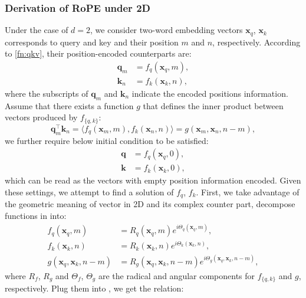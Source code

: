 \documentclass{article}
\def\q{{\boldsymbol q}}
\def\k{{\boldsymbol k}}
\def\x{{\boldsymbol x}}
\begin{document}
\subsubsection{Derivation of RoPE under 2D}\label{appendix:rope-deriv}
Under the case of $d=2$, we consider two-word embedding vectors $\x_q$, $\x_k$ corresponds to query and key and their position $m$ and $n$, respectively. According to \cref{fn:qkv}, their position-encoded counterparts are: 
\begin{equation}
	\begin{aligned}
		\q_m &= f_q(\x_q, m),  \\
		\k_n &= f_k(\x_k, n),
	\end{aligned}
	\label{fn:deri-qk}
\end{equation}
where the subscripts of $\q_m$ and $\k_n$ indicate the encoded positions information. Assume that there exists a function $g$ that defines the inner product between vectors produced by $f_{\{q, k\}}$: 
\begin{equation}
	\q^\intercal_m\k_n = \langle f_q(\x_m, m),f_k(\x_n, n)\rangle= g(\x_m, \x_n, n - m),
	\label{fn:deri-g}
\end{equation}
we further require below initial condition to be satisfied:
\begin{equation}
	\begin{aligned}
		\q &= f_q(\x_q, 0), \\
		\k &= f_k(\x_k, 0), 
	\end{aligned}
	\label{fn:deri-initCond1}
\end{equation}
which can be read as the vectors with empty position information encoded. Given these settings, we attempt to find a solution of $f_q$, $f_k$.  First, we take advantage of the geometric meaning of vector in 2D and its complex counter part, decompose functions in  into:
\begin{equation}
	\begin{aligned}
		f_q(\x_q, m) &= R_q(\x_q, m)e^{i\Theta_q(\x_q, m)}, \\
		f_k(\x_k, n) &= R_k(\x_k, n)e^{i\Theta_k(\x_k, n)}, \\
		g(\x_q, \x_k, n - m) &= R_g(\x_q, \x_k, n - m)e^{i\Theta_g(\x_q, \x_k, n - m)},
	\end{aligned}
\end{equation}
where $R_f$, $R_g$ and $\Theta_f$, $\Theta_g$ are the radical and angular components for $f_{\{q, k\}}$ and $g$, respectively. Plug them into , we get the relation: 
\end{document}
